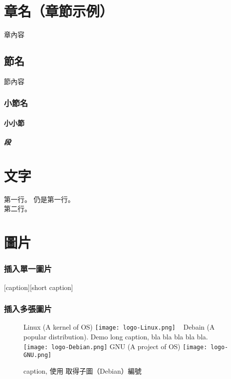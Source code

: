 \documentclass[class=NCU_thesis, crop=false, float=true]{standalone}
\begin{document}


\chapter{章名（章節示例）}
章內容
\section{節名}
節內容
\subsection{小節名}
 \subsubsection{小小節}
 \paragraph{段}


\chapter{文字}
第一行。
仍是第一行。 \\
第二行。


\chapter{圖片}
\subsection{插入單一圖片}
[caption][short caption]

\subsection{插入多張圖片}
\begin{figure}[!hbt]
    \centering
    \subcaptionbox
        {Linux (A kernel of OS)
        \label{fig:subfig_linux}}
        {\texttt{[image: logo-Linux.png]}}
    ~
    \subcaptionbox
        {Debain (A popular distribution). Demo long caption,  bla bla bla bla bla.
        \label{fig:subfig_debian}}
        {\texttt{[image: logo-Debian.png]}}
    \vspace{\baselineskip} %
    \subcaptionbox
        {GNU (A project of OS)
        \label{fig:subfig_gnu}}
        {\texttt{[image: logo-GNU.png]}}
    \caption{caption, 使用 取得子圖（Debian）編號 }
    \label{fig:labal}
\end{figure}
\end{document}
